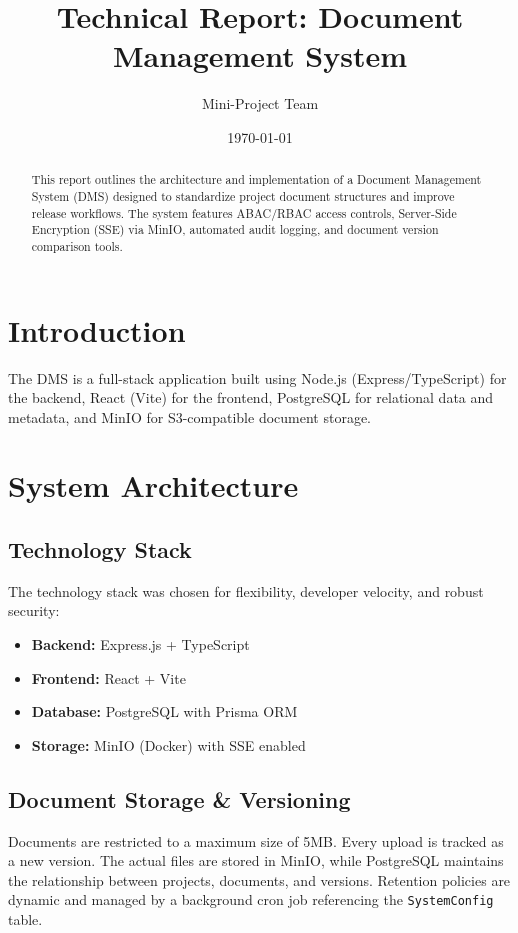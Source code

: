 \documentclass[12pt,a4paper]{article}
\title{Technical Report: Document Management System}
\author{Mini-Project Team}
\date{\today}
\begin{document}
\maketitle

\begin{abstract}
This report outlines the architecture and implementation of a Document Management System (DMS) designed to standardize project document structures and improve release workflows. The system features ABAC/RBAC access controls, Server-Side Encryption (SSE) via MinIO, automated audit logging, and document version comparison tools.
\end{abstract}

\section{Introduction}
The DMS is a full-stack application built using Node.js (Express/TypeScript) for the backend, React (Vite) for the frontend, PostgreSQL for relational data and metadata, and MinIO for S3-compatible document storage.

\section{System Architecture}
\subsection{Technology Stack}
The technology stack was chosen for flexibility, developer velocity, and robust security:
\begin{itemize}
    \item \textbf{Backend:} Express.js + TypeScript
    \item \textbf{Frontend:} React + Vite
    \item \textbf{Database:} PostgreSQL with Prisma ORM
    \item \textbf{Storage:} MinIO (Docker) with SSE enabled
\end{itemize}

\subsection{Document Storage \& Versioning}
Documents are restricted to a maximum size of 5MB. Every upload is tracked as a new version. The actual files are stored in MinIO, while PostgreSQL maintains the relationship between projects, documents, and versions. Retention policies are dynamic and managed by a background cron job referencing the \texttt{SystemConfig} table.
\end{document}
